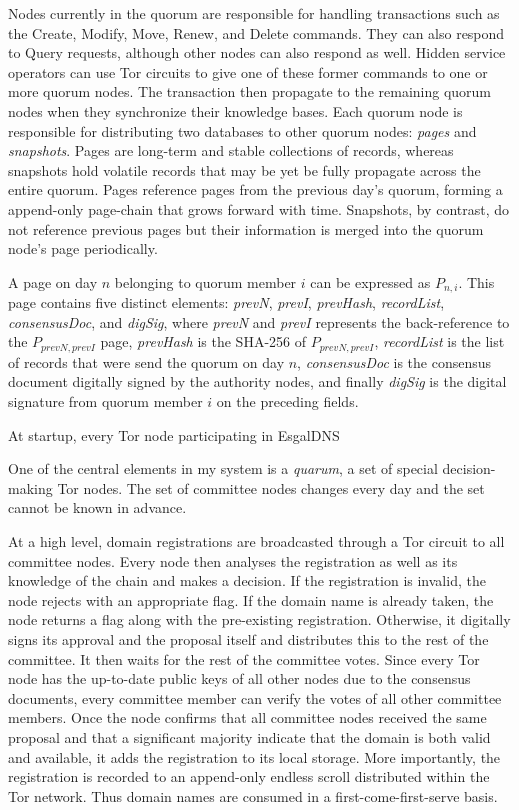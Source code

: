 Nodes currently in the quorum are responsible for handling transactions such as the Create, Modify, Move, Renew, and Delete commands. They can also respond to Query requests, although other nodes can also respond as well. Hidden service operators can use Tor circuits to give one of these former commands to one or more quorum nodes. The transaction then propagate to the remaining quorum nodes when they synchronize their knowledge bases. Each quorum node is responsible for distributing two databases to other quorum nodes: \textit{pages} and \textit{snapshots}. Pages are long-term and stable collections of records, whereas snapshots hold volatile records that may be yet be fully propagate across the entire quorum. Pages reference pages from the previous day's quorum, forming a append-only page-chain that grows forward with time. Snapshots, by contrast, do not reference previous pages but their information is merged into the quorum node's page periodically.




A page on day $ n $ belonging to quorum member $ i $ can be expressed as $ P_{n,i} $. This page contains five distinct elements: \textit{prevN}, \textit{prevI}, \textit{prevHash}, \textit{recordList}, \textit{consensusDoc}, and \textit{digSig}, where \textit{prevN} and \textit{prevI} represents the back-reference to the $ P_{prevN,prevI} $ page, \textit{prevHash} is the SHA-256 of $ P_{prevN,prevI} $, \textit{recordList} is the list of records that were send the quorum on day $ n $, \textit{consensusDoc} is the consensus document digitally signed by the authority nodes, and finally \textit{digSig} is the digital signature from quorum member $ i $ on the preceding fields.

At startup, every Tor node participating in EsgalDNS 







One of the central elements in my system is a \textit{quarum}, a set of special decision-making Tor nodes. The set of committee nodes changes every day and the set cannot be known in advance. 

At a high level, domain registrations are broadcasted through a Tor circuit to all committee nodes. Every node then analyses the registration as well as its knowledge of the chain and makes a decision. If the registration is invalid, the node rejects with an appropriate flag. If the domain name is already taken, the node returns a flag along with the pre-existing registration. Otherwise, it digitally signs its approval and the proposal itself and distributes this to the rest of the committee. It then waits for the rest of the committee votes. Since every Tor node has the up-to-date public keys of all other nodes due to the consensus documents, every committee member can verify the votes of all other committee members. Once the node confirms that all committee nodes received the same proposal and that a significant majority indicate that the domain is both valid and available, it adds the registration to its local storage. More importantly, the registration is recorded to an append-only endless scroll distributed within the Tor network. Thus domain names are consumed in a first-come-first-serve basis.

